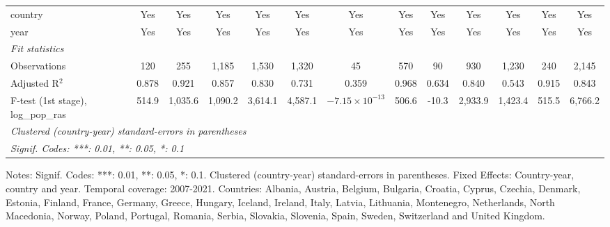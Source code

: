 \begin{table}[htbp]
\begin{tabular}{lcccccccccccc}
      country                         & Yes            & Yes     & Yes          & Yes            & Yes     & Yes                     & Yes            & Yes     & Yes           & Yes     & Yes     & Yes\\  
      year                            & Yes            & Yes     & Yes          & Yes            & Yes     & Yes                     & Yes            & Yes     & Yes           & Yes     & Yes     & Yes\\  
      \midrule
      \emph{Fit statistics}\\
      Observations                    & 120            & 255     & 1,185        & 1,530          & 1,320   & 45                      & 570            & 90      & 930           & 1,230   & 240     & 2,145\\  
      Adjusted R$^2$                  & 0.878          & 0.921   & 0.857        & 0.830          & 0.731   & 0.359                   & 0.968          & 0.634   & 0.840         & 0.543   & 0.915   & 0.843\\  
      F-test (1st stage), log_pop_ras & 514.9          & 1,035.6 & 1,090.2      & 3,614.1        & 4,587.1 & $-7.15\times 10^{-13}$  & 506.6          & -10.3   & 2,933.9       & 1,423.4 & 515.5   & 6,766.2\\  
      \midrule \midrule
      \multicolumn{13}{l}{\emph{Clustered (country-year) standard-errors in parentheses}}\\
      \multicolumn{13}{l}{\emph{Signif. Codes: ***: 0.01, **: 0.05, *: 0.1}}\\
   \end{tabular}
   
   \par \raggedright 
   Notes: Signif. Codes: ***: 0.01, **: 0.05, *: 0.1. Clustered (country-year) standard-errors in parentheses. Fixed Effects: Country-year, country and year. Temporal coverage: 2007-2021. Countries: Albania, Austria, Belgium, Bulgaria, Croatia, Cyprus, Czechia, Denmark, Estonia, Finland, France, Germany, Greece, Hungary, Iceland, Ireland, Italy, Latvia, Lithuania, Montenegro, Netherlands, North Macedonia, Norway, Poland, Portugal, Romania, Serbia, Slovakia, Slovenia, Spain, Sweden, Switzerland and United Kingdom.
\end{table}



